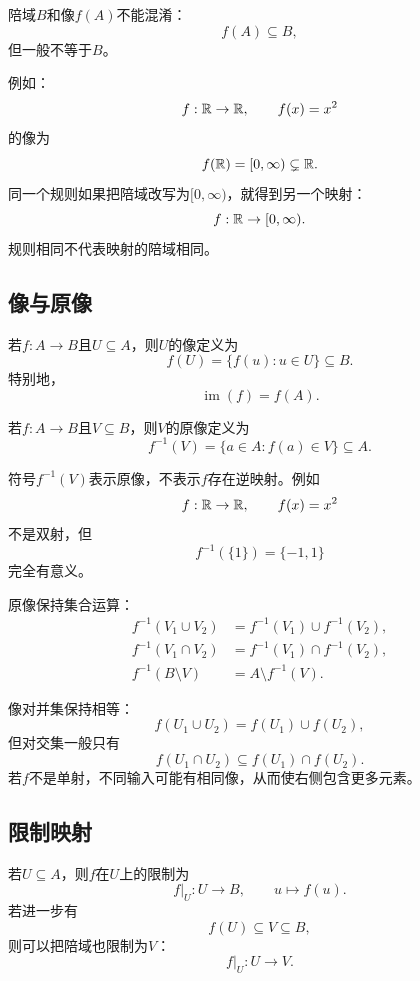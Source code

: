 陪域$B$和像$f(A)$不能混淆：
\[
    f(A)\subseteq B,
\]
但一般不等于$B$。

例如：
\[
    f:\mathbb{R}\to\mathbb{R},\qquad f(x)=x^2
\]
的像为
\[
    f(\mathbb{R})=[0,\infty)\subsetneq\mathbb{R}.
\]
同一个规则如果把陪域改写为$[0,\infty)$，就得到另一个映射：
\[
    f:\mathbb{R}\to[0,\infty).
\]
规则相同不代表映射的陪域相同。

\subsection{像与原像}

\begin{definition}[像]
若$f:A\to B$且$U\subseteq A$，则$U$的像定义为
\[
    f(U)
    =
    \{f(u):u\in U\}\subseteq B.
\]
特别地，
\[
    \operatorname{im}(f)=f(A).
\]
\end{definition}

\begin{definition}[原像]
若$f:A\to B$且$V\subseteq B$，则$V$的原像定义为
\[
    f^{-1}(V)
    =
    \{a\in A:f(a)\in V\}\subseteq A.
\]
\end{definition}

\begin{remark}[原像不要求可逆]
符号$f^{-1}(V)$表示原像，不表示$f$存在逆映射。例如
\[
    f:\mathbb{R}\to\mathbb{R},\qquad f(x)=x^2
\]
不是双射，但
\[
    f^{-1}(\{1\})=\{-1,1\}
\]
完全有意义。
\end{remark}

原像保持集合运算：
\[
\begin{aligned}
    f^{-1}(V_1\cup V_2)
    &=
    f^{-1}(V_1)\cup f^{-1}(V_2),\\
    f^{-1}(V_1\cap V_2)
    &=
    f^{-1}(V_1)\cap f^{-1}(V_2),\\
    f^{-1}(B\setminus V)
    &=
    A\setminus f^{-1}(V).
\end{aligned}
\]

像对并集保持相等：
\[
    f(U_1\cup U_2)=f(U_1)\cup f(U_2),
\]
但对交集一般只有
\[
    f(U_1\cap U_2)\subseteq f(U_1)\cap f(U_2).
\]
若$f$不是单射，不同输入可能有相同像，从而使右侧包含更多元素。

\subsection{限制映射}

若$U\subseteq A$，则$f$在$U$上的限制为
\[
    f\vert_U:U\to B,\qquad
    u\longmapsto f(u).
\]
若进一步有
\[
    f(U)\subseteq V\subseteq B,
\]
则可以把陪域也限制为$V$：
\[
    f\vert_U:U\to V.
\]

